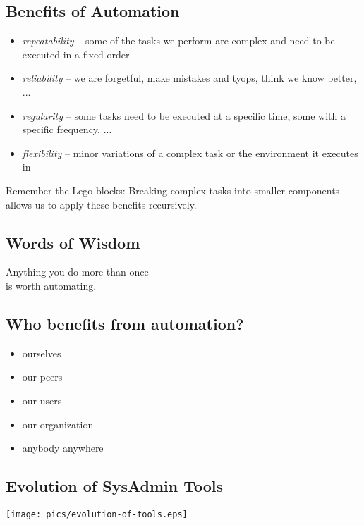 \documentclass[xga]{xdvislides}
\begin{document}
\subsection{Benefits of Automation}
\begin{itemize}
	\item {\em repeatability} -- some of the tasks we
		perform are complex and need to be
		executed in a fixed order
	\item {\em reliability} -- we are forgetful, make
		mistakes and tyops, think we know
		better, ...
	\item {\em regularity} -- some tasks need to
		be executed at a specific time, some with
		a specific frequency, ...
	\item {\em flexibility} -- minor variations of
		a complex task or the environment it
		executes in
\end{itemize}

\vspace{.5in}
Remember the Lego blocks:  Breaking complex tasks
into smaller components allows us to apply these
benefits recursively.

\subsection{Words of Wisdom}
\vspace*{\fill}
\Huge
\begin{center}
Anything you do more than once \\
is worth automating.
\end{center}
\Normalsize
\vspace*{\fill}

\subsection{Who benefits from automation?}
\begin{itemize}
	\item ourselves
	\item our peers
	\item our users
	\item our organization
	\item anybody anywhere
\end{itemize}

\subsection{Evolution of SysAdmin Tools}
\vspace*{\fill}
\begin{center}
	\texttt{[image: pics/evolution-of-tools.eps]}
\end{center}
\vspace*{\fill}
\end{document}
